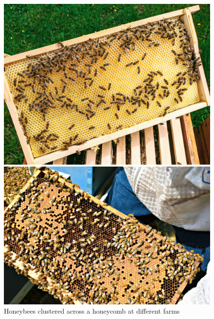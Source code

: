 \documentclass[conference,compsoc,onecolumn]{IEEEtran}
\begin{document}
\begin{figure}[!tbp]
	\centering
	\begin{minipage}[b]{0.4\textwidth}
		\includegraphics[width=\textwidth]{../images/bees-5491347_1920.jpg}
	\end{minipage}
	\hfill
	\begin{minipage}[b]{0.4\textwidth}
		\includegraphics[width=\textwidth]{../images/freelance-sweet-on-bees-new-parasite-causing-threat-for-essential-poll_L3LYZBw.jpg}
	\end{minipage}
	\caption{Honeybees clustered across a honeycomb at different farms \cite{paetkoehler2020, Anstey2020}}
	\label{real-bees}
\end{figure}




\end{document}
